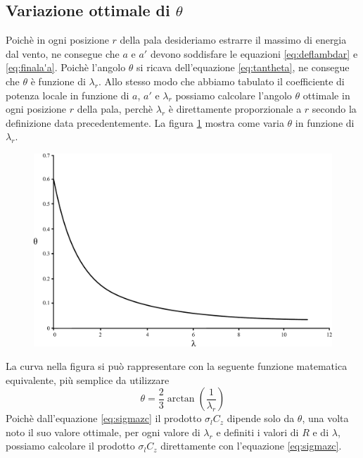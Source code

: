 \subsection{Variazione ottimale di $\theta$}
Poichè in ogni posizione $r$ della pala desideriamo estrarre il massimo di energia dal vento, ne consegue che $a$ e $a'$ devono soddisfare le equazioni \ref{eq:deflambdar}  e \ref{eq:finala'a}. 
Poichè l'angolo $\theta$ si ricava dell'equazione \ref{eq:tantheta}, ne consegue che $\theta$ è funzione di $\lambda_r$. Allo stesso modo che abbiamo tabulato il coefficiente di potenza locale in funzione di $a$, $a'$ e $\lambda_r$ possiamo calcolare l'angolo $\theta$ ottimale in ogni posizione $r$ della pala, perchè $\lambda_r$ è direttamente proporzionale a $r$ secondo la definizione data precedentemente. La figura \ref{fig:lambdatheta} mostra come varia $\theta$ in funzione di $\lambda_r$.
\begin{figure}[h!]
\centering
  \includegraphics[width=.7\textwidth]{fig/lambdatheta.pdf}
\caption{}
\label{fig:lambdatheta}
\end{figure}
La curva nella figura si può rappresentare con la seguente funzione matematica equivalente, più semplice da utilizzare
\begin{equation}
\theta = \frac{2}{3} \arctan \left( \frac{1}{\lambda_r} \right)
\end{equation}
Poichè dall'equazione \ref{eq:sigmazc} il prodotto $\sigma_l C_z$ dipende solo da $\theta$, una volta noto il suo valore ottimale, per ogni valore di $\lambda_r$ e definiti i valori di $R$ e di $\lambda$, possiamo calcolare il prodotto $\sigma_l C_z$ direttamente con l'equazione \ref{eq:sigmazc}.

